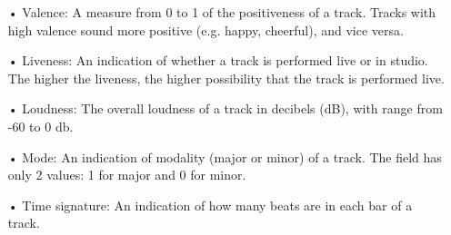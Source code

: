 \begin{itemize}
\item[•] Valence: A measure from 0 to 1 of the positiveness of a track. Tracks with high valence sound more positive (e.g. happy, cheerful), and vice versa.
\item[•] Liveness: An indication of whether a track is performed live or in studio. The higher the liveness, the higher possibility that the track is performed live.
\item[•] Loudness: The overall loudness of a track in decibels (dB), with range from -60 to 0 db. 
\item[•] Mode: An indication of modality (major or minor) of a track. The field has only 2 values: 1 for major and 0 for minor.
\item[•] Time signature: An indication of how many beats are in each bar of a track. 
\end{itemize}



